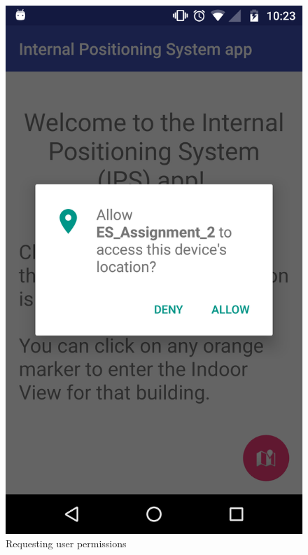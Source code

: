 \documentclass[10.8pt]{article}
\begin{document}
\begin{figure}[H]
    \centering
    \begin{minipage}[b]{.3\textwidth} 
        \centering  
        \includegraphics[scale=1.2, width=\linewidth]{pic0.png}     
        \caption{Requesting user permissions}  
        \label{fig:1}
    \end{minipage}    
    \hfill
    \begin{minipage}[b]{.3\textwidth}  
        \centering  

\end{minipage}
\end{figure}
\end{document}
